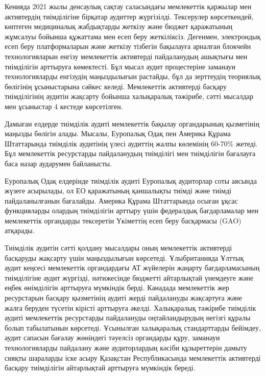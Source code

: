 \begin{multicols}{2}
Кенияда 2021 жылы денсаулық сақтау саласындағы мемлекеттік қаржылар мен
активтердің тиімділігіне бірқатар аудиттер жүргізілді. Тексерулер
көрсеткендей, көптеген медициналық жабдықтарды жеткізу және бюджет
қаражатының жұмсалуы бойынша құжаттама мен есеп беру жеткіліксіз.
Дегенмен, электрондық есеп беру платформаларын және жеткізу тізбегін
бақылауға арналған блокчейн технологияларын енгізу мемлекеттік
активтерді пайдаланудың ашықтығы мен тиімділігін арттыруға көмектесті.
Бұл мысал аудит процестеріне заманауи технологияларды енгізудің
маңыздылығын растайды, бұл да зерттеудің теориялық бөлігінің
ұсыныстарына сәйкес келеді. Мемлекеттік активтерді басқару тиімділігінің
аудитін жақсарту бойынша халықаралық тәжірибе, сәтті мысалдар мен
ұсыныстар 4 кестеде көрсетілген.

Дамыған елдерде тиімділік аудиті мемлекеттік бақылау органдарының
қызметінің маңызды бөлігін алады. Мысалы, Еуропалық Одақ пен Америка
Құрама Штаттарында тиімділік аудитінің үлесі аудиттің жалпы көлемінің
60-70\% жетеді. Бұл мемлекеттік ресурстарды пайдаланудың тиімділігі мен
тиімділігін бағалауға баса назар аударумен байланысты.

Еуропалық Одақ елдерінде тиімділік аудиті Еуропалық аудиторлар соты
аясында жүзеге асырылады, ол ЕО қаражатының қаншалықты тиімді және
тиімді пайдаланылғанын бағалайды. Америка Құрама Штаттарында осыған
ұқсас функцияларды олардың тиімділігін арттыру үшін федералдық
бағдарламалар мен мемлекеттік органдарды тексеретін Үкіметтің есеп беру
басқармасы (GAO) атқарады.

Тиімділік аудитін сәтті қолдану мысалдары оның мемлекеттік активтерді
басқаруды жақсарту үшін маңыздылығын көрсетеді. Ұлыбританияда Ұлттық
аудит кеңсесі мемлекеттік органдардағы АТ жүйелерін жаңарту
бағдарламасының тиімділігіне аудит жүргізді, нәтижесінде бюджетті
айтарлықтай үнемдеуге және еңбек өнімділігін арттыруға мүмкіндік берді.
Канадада мемлекеттік жер ресурстарын басқару қызметінің аудиті жерді
пайдалануды жақсартуға және жалға беруден түсетін кірісті арттыруға
әкелді. Халықаралық тәжірибе тиімділік аудиті мемлекеттік ресурстарды
пайдалануды оңтайландырудың негізгі құралы болып табылатынын көрсетеді.
Ұсынылған халықаралық стандарттарды бейімдеу, аудит сапасын бағалау
жөніндегі тәуелсіз органдарды құру, заманауи технологияларды пайдалану
және аудиторлардың кәсіби құзыреттерін дамыту сияқты шараларды іске
асыру Қазақстан Республикасында мемлекеттік активтерді басқару
тиімділігін айтарлықтай арттыруға мүмкіндік береді.


\end{multicols}
